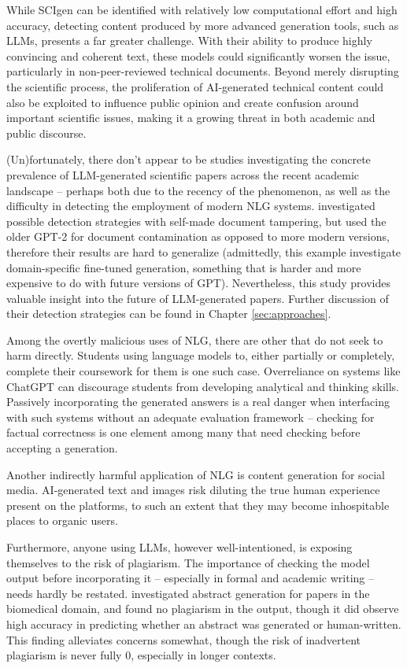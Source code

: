 While SCIgen can be identified with relatively low computational effort and high accuracy, detecting content produced by more advanced generation tools, such as LLMs, presents a far greater challenge.
With their ability to produce highly convincing and coherent text, these models could significantly worsen the issue, particularly in non-peer-reviewed technical documents.
Beyond merely disrupting the scientific process, the proliferation of AI-generated technical content could also be exploited to influence public opinion and create confusion around important scientific issues, making it a growing threat in both academic and public discourse.

(Un)fortunately, there don't appear to be studies investigating the concrete prevalence of LLM-generated scientific papers across the recent academic landscape -- perhaps both due to the recency of the phenomenon, as well as the difficulty in detecting the employment of modern NLG systems.
\citet{rodriguez2022cross} investigated possible detection strategies with self-made document tampering, but used the older GPT-2 for document contamination as opposed to more modern versions, therefore their results are hard to generalize
(admittedly, this example investigate domain-specific fine-tuned generation, something that is harder and more expensive to do with future versions of GPT).
Nevertheless, this study provides valuable insight into the future of LLM-generated papers. Further discussion of their detection strategies can be found in Chapter \ref{sec:approaches}.

Among the overtly malicious uses of NLG, there are other that do not seek to harm directly.
Students using language models to, either partially or completely, complete their coursework for them is one such case.
Overreliance on systems like ChatGPT can discourage students from developing analytical and thinking skills.
Passively incorporating the generated answers is a real danger when interfacing with such systems without an adequate evaluation framework -- checking for factual correctness is one element among many that need checking before accepting a generation.

Another indirectly harmful application of NLG is content generation for social media.
AI-generated text and images risk diluting the true human experience present on the platforms, to such an extent that they may become inhospitable places to organic users.

Furthermore, anyone using LLMs, however well-intentioned, is exposing themselves to the risk of plagiarism.
The importance of checking the model output before incorporating it -- especially in formal and academic writing -- needs hardly be restated.
\citet{gao2022comparing} investigated abstract generation for papers in the biomedical domain, and found no plagiarism in the output, though it did observe high accuracy in predicting whether an abstract was generated or human-written.
This finding alleviates concerns somewhat, though the risk of inadvertent plagiarism is never fully 0, especially in longer contexts.